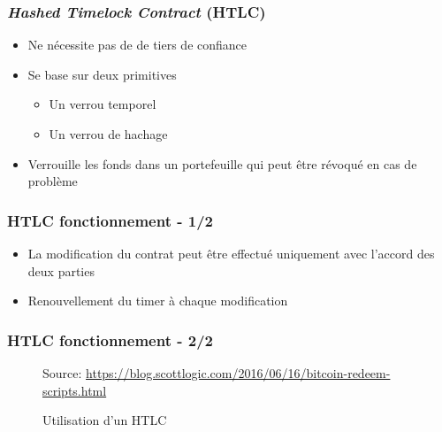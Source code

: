 
\begin{frame}
	\frametitle{\textit{Hashed Timelock Contract} (HTLC)}
	\begin{itemize}
		\item Ne nécessite pas de de tiers de confiance
		\item Se base sur deux primitives
		      \begin{itemize}
			      \item Un verrou temporel
			      \item Un verrou de hachage
		      \end{itemize}
		\item Verrouille les fonds dans un portefeuille qui peut être révoqué en cas de problème
	\end{itemize}
\end{frame}

\begin{frame}
	\frametitle{HTLC fonctionnement - 1/2}
	\begin{itemize}
		\item La modification du contrat peut être effectué uniquement avec l'accord des deux parties
		\item Renouvellement du timer à chaque modification
	\end{itemize}
\end{frame}

\begin{frame}
	\frametitle{HTLC fonctionnement - 2/2}

	\begin{figure}[h!]

		{\scriptsize
			Source: \url{https://blog.scottlogic.com/2016/06/16/bitcoin-redeem-scripts.html}}
		\caption[short]{Utilisation d'un HTLC}
	\end{figure}

\end{frame}

